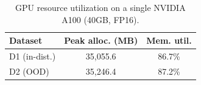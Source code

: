 \begin{table}[t]
    \centering
    \small
    \caption{GPU resource utilization on a single NVIDIA A100 (40GB, FP16).}
    \label{tab:gpu_utilization}
    \begin{tabular}{@{}lcc@{}}
        \toprule
        Dataset & Peak alloc. (MB) & Mem. util. \\
        \midrule
        D1 (in-dist.) & 35{,}055.6 & 86.7\% \\
        D2 (OOD)      & 35{,}246.4 & 87.2\% \\
        \bottomrule
    \end{tabular}
\end{table}
